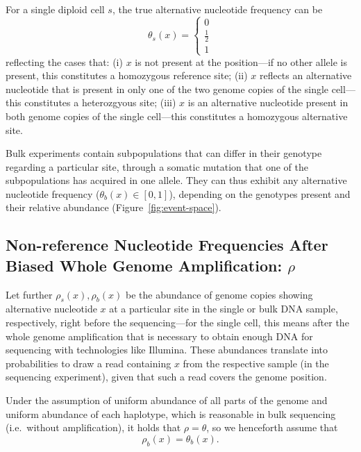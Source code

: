 \documentclass[authoryear,preprint,11pt]{scrartcl}
\begin{document}
For a single diploid cell $s$, the true alternative nucleotide frequency can be
\begin{equation}
 \theta_s(x) =
 \begin{cases}
  0       \\
  \frac12 \\
  1
 \end{cases}
\end{equation}
reflecting the cases that:
(i) $x$ is not present at the position---if no other allele is present, this constitutes a homozygous reference site;
(ii) $x$ reflects an alternative nucleotide that is present in only one of the two genome copies of the single cell---this constitutes a heterozgyous site;
(iii) $x$ is an alternative nucleotide present in both genome copies of the single cell---this constitutes a homozygous alternative site.

Bulk experiments contain subpopulations that can differ in their genotype regarding a particular site, through a somatic mutation that one of the subpopulations has acquired in one allele.
They can thus exhibit any alternative nucleotide frequency ($\theta_{b}(x) \in [0,1]$), depending on the genotypes present and their relative abundance (Figure~\ref{fig:event-space}).

\subsection{Non-reference Nucleotide Frequencies After Biased Whole Genome Amplification: $\rho$}
\label{sec.abundance}

Let further $\rho_{s}(x),\rho_{b}(x)$ be the abundance of genome copies showing alternative nucleotide $x$ at a particular site in the single or bulk DNA sample, respectively, right before the sequencing---for the single cell, this means after the whole genome amplification that is necessary to obtain enough DNA for sequencing with technologies like Illumina.
These abundances translate into probabilities to draw a read containing $x$ from the respective sample (in the sequencing experiment), given that such a read covers the genome position.

Under the assumption of uniform abundance of all parts of the genome and uniform abundance of each haplotype, which is reasonable in bulk sequencing (i.e.~without amplification), it holds that $\rho = \theta$, so we henceforth assume that
\begin{equation}
 \label{eq:rho-b}
 \rho_{b}(x) = \theta_{b}(x).
\end{equation}
\end{document}
